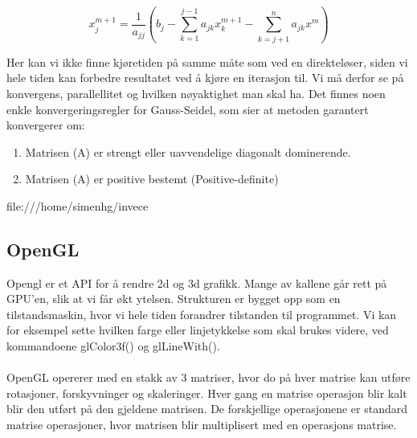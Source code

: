 \documentclass[10pt,a4paper, norsk]{article}
\begin{document}
 \begin{equation} \label{seideliterater}
   x_j^{m+1} = \frac{1}{a_{jj}}  (b_j - \sum_{k=1}^{j-1} a_{jk} x_k^{m+1} - \sum_{k=j+1}^n a_{jk}x^m)
 \end{equation}

Her kan vi ikke finne kjøretiden på samme måte som ved en direkteløser, siden vi hele tiden kan forbedre resultatet ved å kjøre en iterasjon til. Vi må derfor se på konvergens, parallellitet og hvilken nøyaktighet man skal ha. Det finnes noen enkle konvergeringsregler for Gauss-Seidel, som sier at metoden garantert konvergerer om:
\begin{enumerate}
\item Matrisen (A) er strengt eller uavvendelige diagonalt dominerende.
\item Matrisen (A) er positive bestemt (Positive-definite)
\end{enumerate}file:///home/simenhg/invece%



\subsection{OpenGL}
Opengl er et API for å rendre 2d og 3d grafikk. Mange av kallene går rett på GPU'en, slik at vi får økt ytelsen. Strukturen er bygget opp som en tilstandsmaskin, hvor vi hele tiden forandrer tilstanden til programmet. Vi kan for eksempel sette hvilken farge eller linjetykkelse som skal brukes videre, ved kommandoene glColor3f() og glLineWith().

\paragraph{}
OpenGL opererer med en stakk av 3 matriser, hvor do på hver matrise kan utføre rotasjoner, forskyvninger og skaleringer. Hver gang en matrise operasjon blir kalt blir den utført på den gjeldene matrisen. De forskjellige operasjonene er standard matrise operasjoner, hvor matrisen blir multiplisert med en operasjons matrise.
\end{document}
